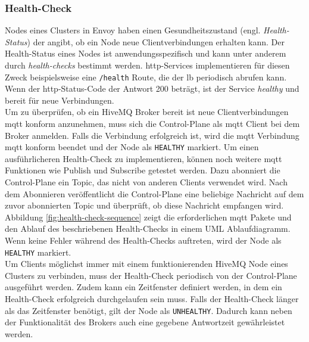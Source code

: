 \subsubsection{Health-Check} \label{ss:health-check}
Nodes eines Clusters in Envoy haben einen Gesundheitszustand (engl. \textit{Health-Status}) der angibt, ob ein Node neue Clientverbindungen erhalten kann.
Der Health-Status eines Nodes ist anwendungsspezifisch und kann unter anderem durch \textit{health-checks} bestimmt werden.
\ac{http}-Services implementieren für diesen Zweck beispielsweise eine \verb|/health| Route, die der \acl{lb} periodisch abrufen kann. Wenn der \ac{http}-Status-Code der Antwort 200 beträgt, ist der Service \textit{healthy} und bereit für neue Verbindungen.
\\
Um zu überprüfen, ob ein HiveMQ Broker bereit ist neue Clientverbindungen \ac{mqtt} konform anzunehmen, muss sich die Control-Plane als \ac{mqtt} Client bei dem Broker anmelden.
Falls die Verbindung erfolgreich ist, wird die \ac{mqtt} Verbindung \ac{mqtt} konform beendet und der Node als \verb|HEALTHY| markiert.
Um einen ausführlicheren Health-Check zu implementieren, können noch weitere \ac{mqtt} Funktionen wie Publish und Subscribe getestet werden. Dazu abonniert die Control-Plane ein Topic, das nicht von anderen Clients verwendet wird. Nach dem Abonnieren veröffentlicht die Control-Plane eine beliebige Nachricht auf dem zuvor abonnierten Topic und überprüft, ob diese Nachricht empfangen wird. Abbildung \ref{fig:health-check-sequence} zeigt die erforderlichen \ac{mqtt} Pakete und den Ablauf des beschriebenen Health-Checks in einem UML Ablaufdiagramm. Wenn keine Fehler während des Health-Checks auftreten, wird der Node als \verb|HEALTHY| markiert.
\\
Um Clients möglichst immer mit einem funktionierenden HiveMQ Node eines Clusters zu verbinden, muss der Health-Check periodisch von der Control-Plane ausgeführt werden.
Zudem kann ein Zeitfenster definiert werden, in dem ein Health-Check erfolgreich durchgelaufen sein muss.
Falls der Health-Check länger als das Zeitfenster benötigt, gilt der Node als \verb|UNHEALTHY|. Dadurch kann neben der Funktionalität des Brokers auch eine gegebene Antwortzeit gewährleistet werden.
